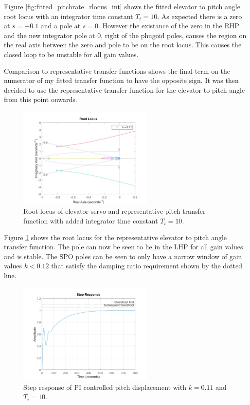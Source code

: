 \documentclass{article}
\begin{document}
Figure \ref{fig:fitted_pitchrate_rlocus_int} shows the fitted elevator to pitch angle root locus with an integrator time constant $T_i = 10$.
As expected there is a zero at $s=-0.1$ and a pole at $s=0$.
However the existance of the zero in the RHP and the new integrator pole at 0, right of the phugoid poles, causes the region on the real axis between the zero and pole to be on the root locus.
This causes the closed loop to be unstable for all gain values.

Comparison to representative transfer functions \cite{rep} shows the final term on the numerator of my fitted transfer function to have the opposite sign.
It was then decided to use the representative transfer function for the elevator to pitch angle from this point onwards.

\begin{figure}[H]
    \centering
    \includegraphics[width=0.6\textwidth]{figures/pitch_autopilot_locus_Ti.png}
    \caption{Root locus of elevator servo and representative pitch transfer function \cite{rep} with added integrator time constant $T_i = 10$.}
    \label{fig:representative_pitchrate_rlocus_int}
\end{figure}

Figure \ref{fig:representative_pitchrate_rlocus_int} shows the root locus for the representative elevator to pitch angle transfer function.
The pole can now be seen to lie in the LHP for all gain values and is stable.
The SPO poles can be seen to only have a narrow window of gain values $k < 0.12$ that satisfy the damping ratio requirement shown by the dotted line.

\begin{figure}[H]
    \centering
    \includegraphics[width=0.6\textwidth]{figures/pitch_autopilot_uncompensated_step.png}
    \caption{Step response of PI controlled pitch displacement with $k=0.11$ and $T_i = 10$.}
    \label{fig:pitch_autopilot_uncompensated_step}
\end{figure}
\end{document}
